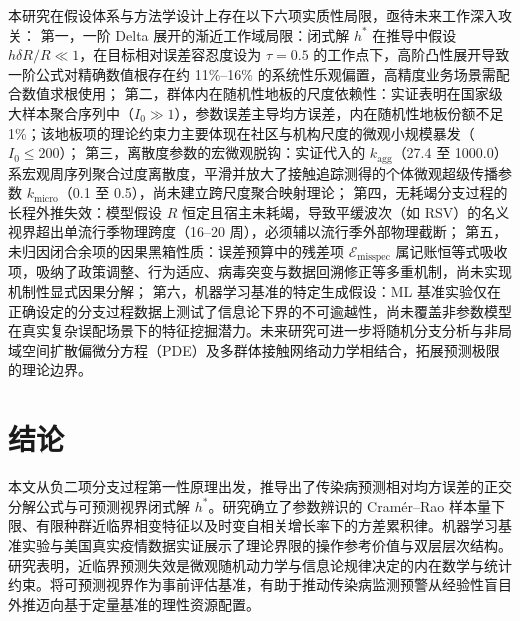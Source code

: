 \documentclass[11pt,a4paper]{article}
\theoremstyle{plain}
\theoremstyle{definition}
\begin{document}
本研究在假设体系与方法学设计上存在以下六项实质性局限，亟待未来工作深入攻关：
第一，一阶 Delta 展开的渐近工作域局限：闭式解 $h^*$ 在推导中假设 $h \delta R / R \ll 1$，在目标相对误差容忍度设为 $\tau = 0.5$ 的工作点下，高阶凸性展开导致一阶公式对精确数值根存在约 11\%--16\% 的系统性乐观偏置，高精度业务场景需配合数值求根使用；
第二，群体内在随机性地板的尺度依赖性：实证表明在国家级大样本聚合序列中（$I_0 \gg 1$），参数误差主导均方误差，内在随机性地板份额不足 1\%；该地板项的理论约束力主要体现在社区与机构尺度的微观小规模暴发（$I_0 \le 200$）；
第三，离散度参数的宏微观脱钩：实证代入的 $k_{\text{agg}}$（27.4 至 1000.0）系宏观周序列聚合过度离散度，平滑并放大了接触追踪测得的个体微观超级传播参数 $k_{\text{micro}}$（0.1 至 0.5），尚未建立跨尺度聚合映射理论；
第四，无耗竭分支过程的长程外推失效：模型假设 $R$ 恒定且宿主未耗竭，导致平缓波次（如 RSV）的名义视界超出单流行季物理跨度（16--20 周），必须辅以流行季外部物理截断；
第五，未归因闭合余项的因果黑箱性质：误差预算中的残差项 $\mathcal{E}_{\text{misspec}}$ 属记账恒等式吸收项，吸纳了政策调整、行为适应、病毒突变与数据回溯修正等多重机制，尚未实现机制性显式因果分解；
第六，机器学习基准的特定生成假设：ML 基准实验仅在正确设定的分支过程数据上测试了信息论下界的不可逾越性，尚未覆盖非参数模型在真实复杂误配场景下的特征挖掘潜力。未来研究可进一步将随机分支分析与非局域空间扩散偏微分方程（PDE）及多群体接触网络动力学相结合，拓展预测极限的理论边界。

\section{结论}

本文从负二项分支过程第一性原理出发，推导出了传染病预测相对均方误差的正交分解公式与可预测视界闭式解 $h^*$。研究确立了参数辨识的 Cram\'er--Rao 样本量下限、有限种群近临界相变特征以及时变自相关增长率下的方差累积律。机器学习基准实验与美国真实疫情数据实证展示了理论界限的操作参考价值与双层层次结构。研究表明，近临界预测失效是微观随机动力学与信息论规律决定的内在数学与统计约束。将可预测视界作为事前评估基准，有助于推动传染病监测预警从经验性盲目外推迈向基于定量基准的理性资源配置。



\end{document}
